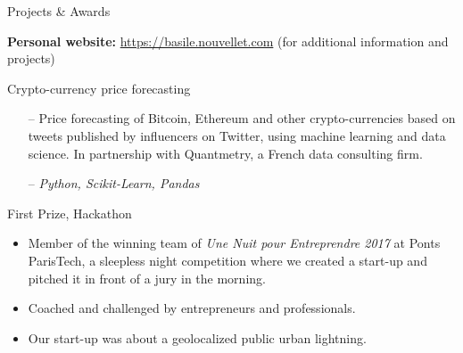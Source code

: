 \documentclass[]{mcdowellcv}
\begin{document}
    \begin{cvsection}{Projects \& Awards}

        \hspace{4pt} \textbf{Personal website:} {\small \color{blue} \url{https://basile.nouvellet.com}} ({\small for additional information and projects})

        \begin{cvsubsection}{Crypto-currency price forecasting}{}{}
            \begin{itemize}
                \item[--] Price forecasting of Bitcoin, Ethereum and other crypto-currencies based on tweets published by influencers on Twitter, using machine learning and data science. In partnership with Quantmetry, a French data consulting firm.
                \item[--] \textit{Python, Scikit-Learn, Pandas}
            \end{itemize}
        \end{cvsubsection}

        \begin{cvsubsection}{First Prize, Hackathon}{}{}
            \begin{itemize}
                \item Member of the winning team of \textit{Une Nuit pour Entreprendre 2017} at Ponts ParisTech, a sleepless
                night competition where we created a start-up and pitched it in front of a jury in the morning.
                \item Coached and challenged by entrepreneurs and professionals.
                \item Our start-up was about a geolocalized public urban lightning.
            \end{itemize}
        \end{cvsubsection}
    \end{cvsection}
\end{document}
